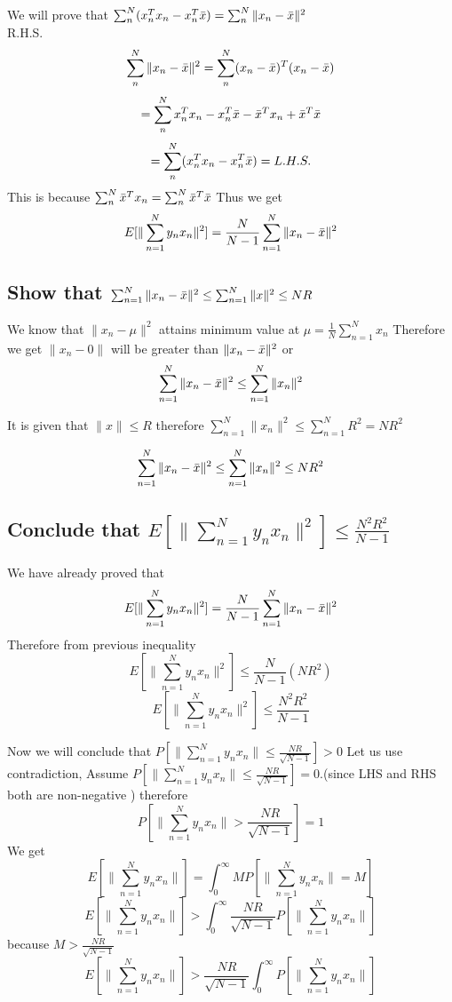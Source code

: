 \documentclass{article}
\begin{document}
We will prove that $\sum_{n}^{N}(x_n^Tx_n - x_n^T\Bar{x}) = \sum_{n}^{N}\|x_n - \Bar{x}\|^2$\\
R.H.S. \\
$$\sum_{n}^{N}\|x_n - \Bar{x}\|^2 =\sum_{n}^{N}(x_n - \Bar{x})^T(x_n - \Bar{x}) $$
$$
=\sum_{n}^{N}x_n^Tx_n - x_n^T\Bar{x} -\Bar{x}^Tx_n + \Bar{x}^T\Bar{x} 
$$
$$ =\sum_{n}^{N}(x_n^Tx_n - x_n^T\Bar{x})  = L.H.S. $$
This is because $\sum_{n}^{N}\Bar{x}^Tx_n = \sum_{n}^{N}\Bar{x}^T\Bar{x}$
Thus we get 
$$
E[\|\sum_{n=1}^{N}y_nx_n\|^2] = \frac{N}{N-1}\sum_{n=1}^{N}\|x_n - \Bar{x}\|^2
$$
\subsection{Show that $\sum_{n=1}^{N}\|x_n - \Bar{x}\|^2 \leq \sum_{n = 1}^{N} \|x\|^2\leq NR$}
We know that $\|x_n - \mu \|^2$ attains minimum value at $\mu = \frac{1}{N}\sum_{n = 1}^{N}x_n$ Therefore we get 
$\|x_n - 0\|$ will be greater than $\|x_n - \Bar{x}\|^2$
or 
$$\sum_{n=1}^{N}\|x_n - \Bar{x}\|^2 \leq \sum_{n=1}^{N}\|x_n\|^2 $$

It is given that $\|x\| \leq R$ therefore 
$ \sum_{n=1}^{N}\|x_n\|^2  \leq \sum_{n=1}^{N}R^2 = NR^2 $

$$\sum_{n=1}^{N}\|x_n - \Bar{x}\|^2 \leq \sum_{n=1}^{N}\|x_n\|^2 \leq NR^2$$

\subsection{ Conclude that $E[\|\sum_{n=1}^{N}y_nx_n\|^2] \leq \frac{N^2R^2}{N-1}$ }
We have already proved that 
$$
E[\|\sum_{n=1}^{N}y_nx_n\|^2] = \frac{N}{N-1}\sum_{n=1}^{N}\|x_n - \Bar{x}\|^2
$$
Therefore from previous inequality $$
E[\|\sum_{n=1}^{N}y_nx_n\|^2] \leq \frac{N}{N-1}(NR^2)
$$ 
$$
E[\|\sum_{n=1}^{N}y_nx_n\|^2] \leq \frac{N^2R^2}{N-1}
$$

Now we will conclude that $P[\|\sum_{n=1}^{N}y_nx_n\| \leq \frac{NR}{\sqrt{N-1}}]>0$
Let us use contradiction, Assume  $P[\|\sum_{n=1}^{N}y_nx_n\| \leq \frac{NR}{\sqrt{N-1}}] = 0$.(since LHS and RHS both are non-negative ) therefore  $$P[\|\sum_{n=1}^{N}y_nx_n\| > \frac{NR}{\sqrt{N-1}}] = 1 $$
We get 
$$
E[\|\sum_{n=1}^{N}y_nx_n\|] = \int_{0}^{\infty}MP[\|\sum_{n=1}^{N}y_nx_n\| = M]
$$
$$
E[\|\sum_{n=1}^{N}y_nx_n\|] > \int_{0}^{\infty}\frac{NR}{\sqrt{N-1}}P[\|\sum_{n=1}^{N}y_nx_n\|]
$$
because $M > \frac{NR}{\sqrt{N-1}}$
$$
E[\|\sum_{n=1}^{N}y_nx_n\|] > \frac{NR}{\sqrt{N-1}}\int_{0}^{\infty}P[\|\sum_{n=1}^{N}y_nx_n\|]
$$
\end{document}

